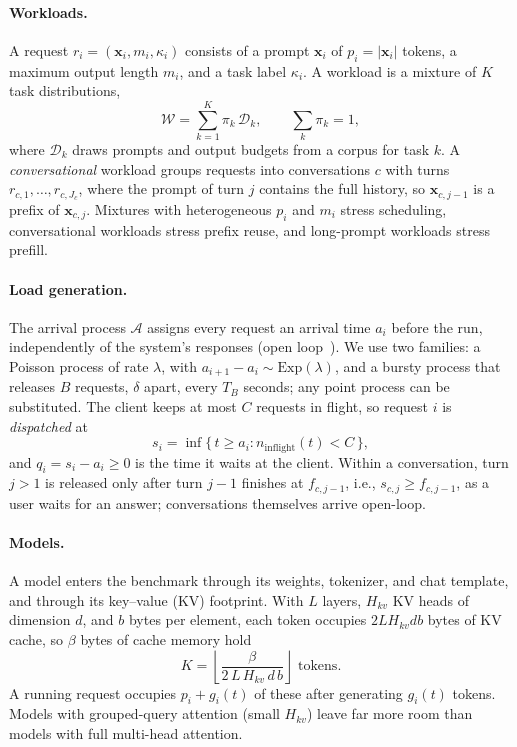 \paragraph{Workloads.}
A request $r_i = (\mathbf{x}_i, m_i, \kappa_i)$ consists of a prompt $\mathbf{x}_i$ of
$p_i = |\mathbf{x}_i|$ tokens, a maximum output length $m_i$, and a task label $\kappa_i$.
A workload is a mixture of $K$ task distributions,
\begin{equation}
  \mathcal{W} = \sum_{k=1}^{K} \pi_k \, \mathcal{D}_k, \qquad \sum_{k} \pi_k = 1,
  \label{eq:workload}
\end{equation}
where $\mathcal{D}_k$ draws prompts and output budgets from a corpus for task $k$. A
\emph{conversational} workload groups requests into conversations $c$ with turns
$r_{c,1}, \dots, r_{c,J_c}$, where the prompt of turn $j$ contains the full history, so
$\mathbf{x}_{c,j-1}$ is a prefix of $\mathbf{x}_{c,j}$. Mixtures with heterogeneous $p_i$ and $m_i$
stress scheduling, conversational workloads stress prefix reuse, and long-prompt workloads stress
prefill.

\paragraph{Load generation.}
The arrival process $\mathcal{A}$ assigns every request an arrival time $a_i$ before the run,
independently of the system's responses (open loop~\cite{schroeder2006open}). We use two
families: a Poisson process of rate $\lambda$, with $a_{i+1} - a_i \sim \mathrm{Exp}(\lambda)$, and a
bursty process that releases $B$ requests, $\delta$ apart, every $T_B$ seconds; any point process
can be substituted. The client keeps at most $C$ requests in flight, so request $i$ is
\emph{dispatched} at
\begin{equation}
  s_i = \inf\{\, t \ge a_i : n_{\mathrm{inflight}}(t) < C \,\},
  \label{eq:dispatch}
\end{equation}
and $q_i = s_i - a_i \ge 0$ is the time it waits at the client. Within a conversation, turn $j > 1$
is released only after turn $j-1$ finishes at $f_{c,j-1}$, i.e., $s_{c,j} \ge f_{c,j-1}$, as a
user waits for an answer; conversations themselves arrive open-loop.

\paragraph{Models.}
A model enters the benchmark through its weights, tokenizer, and chat template, and through its
key--value (KV) footprint. With $L$ layers, $H_{kv}$ KV heads of dimension $d$, and $b$ bytes per
element, each token occupies $2 L H_{kv} d b$ bytes of KV cache, so $\beta$ bytes of cache memory
hold
\begin{equation}
  K = \left\lfloor \frac{\beta}{2 \, L \, H_{kv} \, d \, b} \right\rfloor \text{ tokens}.
  \label{eq:kvcap}
\end{equation}
A running request occupies $p_i + g_i(t)$ of these after generating $g_i(t)$ tokens. Models with
grouped-query attention (small $H_{kv}$) leave far more room than models with full multi-head
attention.

